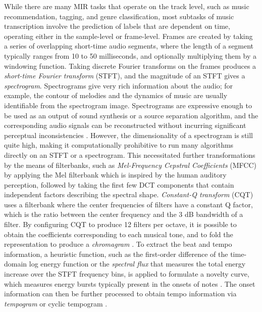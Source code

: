 While there are many MIR tasks that operate on the track level, such as music recommendation, tagging, and genre classification, most subtasks of music transcription involve the prediction of labels that are dependent on time, operating either in the sample-level or frame-level.
Frames are created by taking a series of overlapping short-time audio segments, where the length of a segment typically ranges from 10 to 50 milliseconds, and optionally multiplying them by a windowing function.
Taking discrete Fourier transforms on the frames produces a \emph{short-time Fourier transform} (STFT), and the magnitude of an STFT gives a \emph{spectrogram}.
Spectrograms give very rich information about the audio; for example, the contour of melodies and the dynamics of music are usually identifiable from the spectrogram image.
Spectrograms are expressive enough to be used as an output of sound synthesis or a source separation algorithm, and the corresponding audio signals can be reconstructed without incurring significant perceptual inconsistencies \cite{griffin1984lim, leroux2010spectrogram}.
However, the dimensionality of a spectrogram is still quite high, making it computationally prohibitive to run many algorithms directly on an STFT or a spectrogram.
This necessitated further transformations by the means of filterbanks, such as \emph{Mel-Frequency Cepstral Coefficients} (MFCC) \cite{logan2000mfcc} by applying the Mel filterbank which is inspired by the human auditory perception, followed by taking the first few DCT components that contain independent factors describing the spectral shape.
\emph{Constant-Q transform} (CQT) \cite{schorkhuber2010cqt} uses a filterbank where the center frequencies of filters have a constant Q factor, which is the ratio between the center frequency and the 3 dB bandwidth of a filter.
By configuring CQT to produce 12 filters per octave, it is possible to obtain the coefficients corresponding to each musical tone, and to fold the representation to produce a \emph{chromagram} \cite{bello2005chromagram}.
To extract the beat and tempo information, a heuristic function, such as the first-order difference of the time-domain log energy function or the \emph{spectral flux} that measures the total energy increase over the STFT frequency bins, is applied to formulate a novelty curve, which measures energy bursts typically present in the onsets of notes \cite{bello2005onset}.
The onset information can then be further processed to obtain tempo information via \emph{tempogram} \cite{cemgil2000tempogram} or cyclic tempogram \cite{grosche2010tempogram}.


